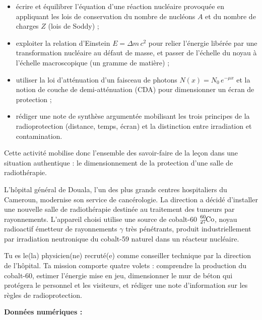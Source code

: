 \documentclass[11pt]{article}
\newcommand{\cle}[1]{{\popxbold\color{popdark}#1}}
\newcounter{popsec}
\newcounter{popsub}
\newcommand{\courssub}[1]{%
  \stepcounter{popsub}%
  \par\vspace{9pt}\noindent{\popxbold\fontsize{11.5}{13}\selectfont\color{popink}{\color{poporange}\thepopsec.\thepopsub}\hspace{6pt}#1}\par\nopagebreak\vspace{4pt}
}
\begin{document}
\begin{itemize}
\item écrire et équilibrer l'équation d'une réaction nucléaire provoquée en appliquant les \cle{lois de conservation} du nombre de nucléons $A$ et du nombre de charges $Z$ (lois de Soddy) ;
\item exploiter la relation d'Einstein $E = \Delta m\,c^{2}$ pour relier l'énergie libérée par une transformation nucléaire au défaut de masse, et passer de l'échelle du noyau à l'échelle macroscopique (un gramme de matière) ;
\item utiliser la loi d'atténuation d'un faisceau de photons $N(x) = N_{0}\,e^{-\mu x}$ et la notion de \cle{couche de demi-atténuation} (CDA) pour dimensionner un écran de protection ;
\item rédiger une note de synthèse argumentée mobilisant les trois principes de la \cle{radioprotection} (distance, temps, écran) et la distinction entre \cle{irradiation} et \cle{contamination}.
\end{itemize}

Cette activité mobilise donc l'ensemble des savoir-faire de la leçon dans une situation authentique : le dimensionnement de la protection d'une salle de radiothérapie.

\courssub{Situation}

L'hôpital général de Douala, l'un des plus grands centres hospitaliers du Cameroun, modernise son service de cancérologie. La direction a décidé d'installer une nouvelle salle de \cle{radiothérapie} destinée au traitement des tumeurs par rayonnements. L'appareil choisi utilise une source de \cle{cobalt-60} $\ce{^{60}_{27}Co}$, noyau radioactif émetteur de rayonnements $\gamma$ très pénétrants, produit industriellement par irradiation neutronique du cobalt-59 naturel dans un réacteur nucléaire.

Tu es le(la) physicien(ne) recruté(e) comme conseiller technique par la direction de l'hôpital. Ta mission comporte quatre volets : comprendre la production du cobalt-60, estimer l'énergie mise en jeu, dimensionner le mur de béton qui protégera le personnel et les visiteurs, et rédiger une note d'information sur les règles de radioprotection.

\textbf{Données numériques :}
\end{document}
